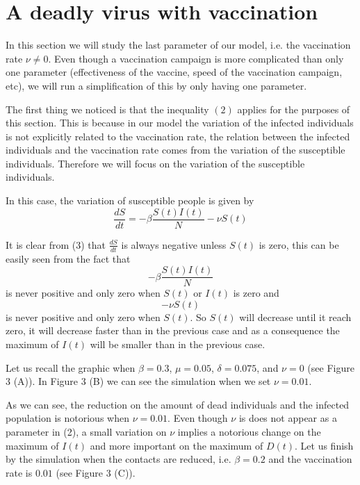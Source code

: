 \documentclass[14pt]{amsart}
\begin{document}
\section{A deadly virus with vaccination}

In this section we will study the last parameter of our model, i.e. the vaccination rate $\nu \neq 0$. Even though a vaccination campaign is more complicated than only one parameter (effectiveness of the vaccine, speed of the vaccination campaign, etc), we will run a simplification of this by only having one parameter.

The first thing we noticed is that the inequality $(2)$ applies for the purposes of this section. This is because in our model the variation of the infected individuals is not explicitly related to the vaccination rate, the relation between the infected individuals and the vaccination rate comes from the variation of the susceptible individuals. Therefore we will focus on the variation of the susceptible individuals.

In this case, the variation of susceptible people is given by  
\begin{equation}
\frac{d S}{dt}= -\beta \frac{S(t)I(t)}{N} -\nu S(t)
\end{equation}   

It is clear from (3) that $\frac{dS}{dt}$ is always negative unless $S(t)$ is zero, this can be easily seen from the fact that $$-\beta \frac{S(t)I(t)}{N}$$ is never positive and only zero when $S(t)$ or $I(t)$ is zero and $$-\nu S(t)$$ is never positive and only zero when $S(t)$. So $S(t)$ will decrease until it reach zero, it will decrease faster than in the previous case and as a consequence the maximum of $I(t)$ will be smaller than in the previous case.

Let us recall the graphic when $\beta=0.3$, $\mu=0.05$, $\delta=0.075$, and $\nu=0$ (see Figure 3 (A)).
In Figure 3 (B) we can see the simulation when we set $\nu=0.01$.

As we can see, the reduction on the amount of dead individuals and the infected population is notorious when $\nu=0.01$. Even though $\nu$ is does not appear as a parameter in (2), a small variation on $\nu$ implies a notorious change on the maximum of $I(t)$ and more important on the maximum of $D(t)$. Let us finish by the simulation when the contacts are reduced, i.e. $\beta=0.2$ and the vaccination rate is $0.01$ (see Figure 3 (C)).
\end{document}
